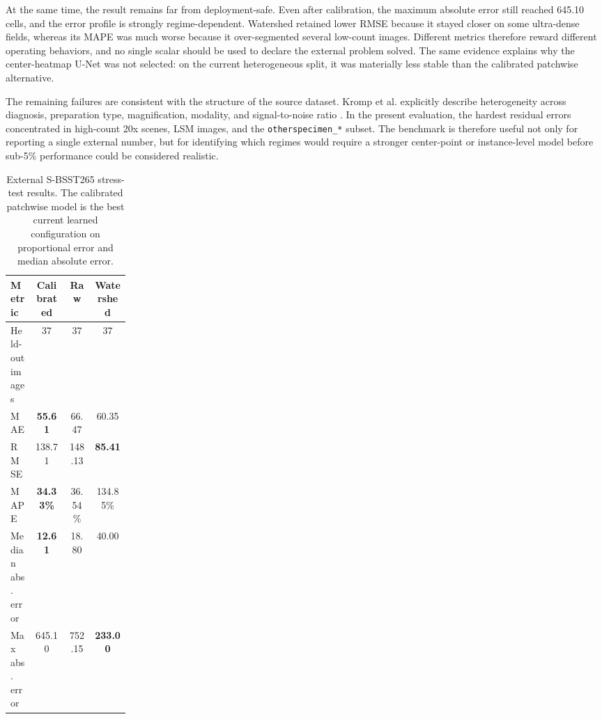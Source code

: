 \documentclass[10pt,a4paper,twocolumn]{article}
\begin{document}
At the same time, the result remains far from deployment-safe. Even after calibration, the maximum absolute error still reached 645.10 cells, and the error profile is strongly regime-dependent. Watershed retained lower RMSE because it stayed closer on some ultra-dense fields, whereas its MAPE was much worse because it over-segmented several low-count images. Different metrics therefore reward different operating behaviors, and no single scalar should be used to declare the external problem solved. The same evidence explains why the center-heatmap U-Net was not selected: on the current heterogeneous split, it was materially less stable than the calibrated patchwise alternative.

The remaining failures are consistent with the structure of the source dataset. Kromp et al. explicitly describe heterogeneity across diagnosis, preparation type, magnification, modality, and signal-to-noise ratio \cite{kromp_dataset}. In the present evaluation, the hardest residual errors concentrated in high-count 20x scenes, LSM images, and the \texttt{otherspecimen\_*} subset. The benchmark is therefore useful not only for reporting a single external number, but for identifying which regimes would require a stronger center-point or instance-level model before sub-5\% performance could be considered realistic.

\begin{table}[H]
\centering
\scriptsize
\begin{tabular}{L{0.20\linewidth} c c c}
\toprule
\textbf{Metric} & \textbf{Calibrated} & \textbf{Raw} & \textbf{Watershed} \\
\midrule
Held-out images & 37 & 37 & 37 \\
MAE & \textbf{55.61} & 66.47 & 60.35 \\
RMSE & 138.71 & 148.13 & \textbf{85.41} \\
MAPE & \textbf{34.33\%} & 36.54\% & 134.85\% \\
Median abs. error & \textbf{12.61} & 18.80 & 40.00 \\
Max abs. error & 645.10 & 752.15 & \textbf{233.00} \\
\bottomrule
\end{tabular}
\caption{External S-BSST265 stress-test results. The calibrated patchwise model is the best current learned configuration on proportional error and median absolute error.}
\label{tab:external}
\end{table}
\end{document}

